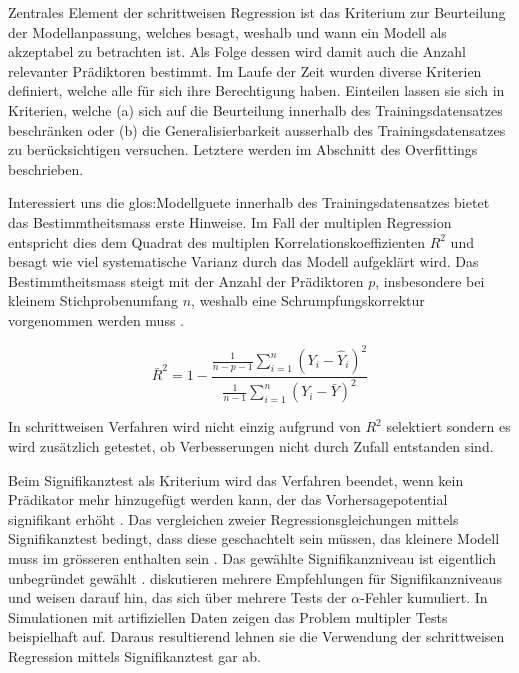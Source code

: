 Zentrales Element der schrittweisen Regression ist das Kriterium zur Beurteilung der  Modellanpassung, welches besagt, weshalb und wann ein Modell als akzeptabel zu betrachten ist. Als Folge dessen wird damit auch die Anzahl relevanter Prädiktoren bestimmt. Im Laufe der Zeit wurden diverse Kriterien definiert, welche alle für sich ihre Berechtigung haben.
Einteilen lassen sie sich in Kriterien, welche (a) sich auf die Beurteilung innerhalb des Trainingsdatensatzes beschränken oder (b) die Generalisierbarkeit ausserhalb des Trainingsdatensatzes zu berücksichtigen versuchen. Letztere werden im Abschnitt des Overfittings beschrieben.

Interessiert uns die \Gls{glos:Modellguete} innerhalb des Trainingsdatensatzes bietet das Bestimmtheitsmass erste Hinweise. Im Fall der multiplen Regression entspricht dies dem Quadrat des multiplen Korrelationskoeffizienten $R^2$ und  besagt wie viel systematische Varianz durch das Modell aufgeklärt  wird. 
Das Bestimmtheitsmass steigt mit der Anzahl der Prädiktoren $p$, insbesondere bei kleinem Stichprobenumfang $n$, weshalb eine Schrumpfungskorrektur vorgenommen werden muss \cite[p. 451]{bortz2011}. 

\begin{equation}
\bar R^2=1-\frac{\displaystyle \frac{1}{n-p-1} \sum_{i=1}^n (Y_i-\hat{Y}_i)^2}{\displaystyle \frac{1}{n-1} \sum_{i=1}^n (Y_i-\bar{Y})^2}
\tag{korrigiertes Bestimmtheitsmass}
\end{equation}

In schrittweisen Verfahren wird nicht einzig aufgrund von $R^2$ selektiert sondern es wird zusätzlich getestet, ob Verbesserungen nicht durch Zufall entstanden sind. 

Beim Signifikanztest als Kriterium wird das Verfahren beendet, wenn kein Prädikator mehr hinzugefügt werden kann, der das Vorhersagepotential signifikant erhöht \cite[p.48]{bendel1977comparison}. 
Das vergleichen zweier Regressionsgleichungen mittels Signifikanztest bedingt, dass diese geschachtelt sein müssen, das kleinere Modell muss im grösseren enthalten sein \cite[p. 508]{jacob2003applied}.
Das gewählte Signifikanzniveau ist eigentlich unbegründet gewählt \cite[p. 174]{weakliem2004introduction}.  diskutieren mehrere Empfehlungen für Signifikanzniveaus und weisen darauf hin, das sich über mehrere Tests der $\alpha$-Fehler kumuliert. 
In  Simulationen mit artifiziellen Daten zeigen  das  Problem multipler Tests beispielhaft auf. 
Daraus resultierend lehnen sie die Verwendung der schrittweisen Regression mittels Signifikanztest gar ab.

